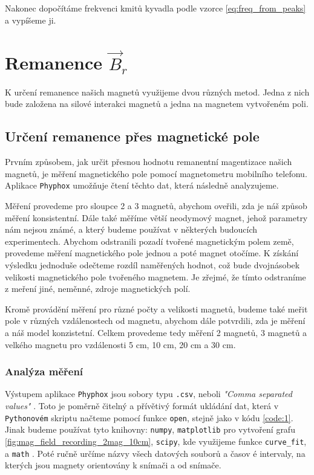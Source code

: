 \documentclass[12pt, a4paper,
 twoside,        %
 openright
]{report}
\begin{document}
Nakonec dopočítáme frekvenci kmitů kyvadla podle vzorce \ref{eq:freq_from_peaks} a vypíšeme ji.



\section{Remanence $\vec{B}_r$}
\label{sec:remanence_measurement}

K určení remanence našich magnetů využijeme dvou různých metod. Jedna z nich bude založena na silové interakci magnetů a jedna na magnetem vytvořeném poli.

\subsection{Určení remanence přes magnetické pole}

Prvním způsobem, jak určit přesnou hodnotu remanentní magentizace našich magnetů, je měření magnetického pole pomocí magnetometru mobilního telefonu.
Aplikace \texttt{Phyphox} umožňuje čtení těchto dat, která následně analyzujeme.

Měření provedeme pro sloupce 2 a 3 magnetů, abychom oveřili, zda je náš způsob měření konsistentní.
Dále také měříme větší neodymový magnet, jehož parametry nám nejsou známé, a který budeme používat v některých budoucích experimentech.
Abychom odstranili pozadí tvořené magnetickým polem země, provedeme měření magnetického pole jednou a poté magnet otočíme.
K získání výsledku jednoduše odečteme rozdíl naměřených hodnot, což bude dvojnásobek velikosti magnetického pole tvořeného magnetem.
Je zřejmé, že tímto odstraníme z meření jiné, neměnné, zdroje magnetických polí.

Kromě provádění měření pro různé počty a velikosti magnetů, budeme také meřit pole v různých vzdálenostech od magnetu, abychom dále potvrdili, zda je měření a náš model konzistetní.
Celkem provedeme tedy měření 2 magnetů, 3 magnetů a velkého magnetu pro vzdálenosti 5 cm, 10 cm, 20 cm a 30 cm.

\subsubsection{Analýza měření}
Výstupem aplikace \texttt{Phyphox} jsou sobory typu \texttt{.csv}, neboli \textit{"Comma separated values"} \cite{csv}.
Toto je poměrně čitelný a přívětivý formát ukládání dat, která v \texttt{Pythonovém} skriptu načteme pomocí funkce \texttt{open}, stejně jako v kódu \ref{code:1}.
Jinak budeme používat tyto knihovny:
\texttt{numpy},
\texttt{matplotlib} pro vytvoření grafu \ref{fig:mag_field_recording_2mag_10cm},
\texttt{scipy}, kde využijeme funkce \texttt{curve\_fit}, a
\texttt{math} \cite{pymath}.
Poté ručně určíme názvy všech datových souborů a časov  é intervaly, na kterých jsou magnety orientovány k snímači a od snímače.
\end{document}
